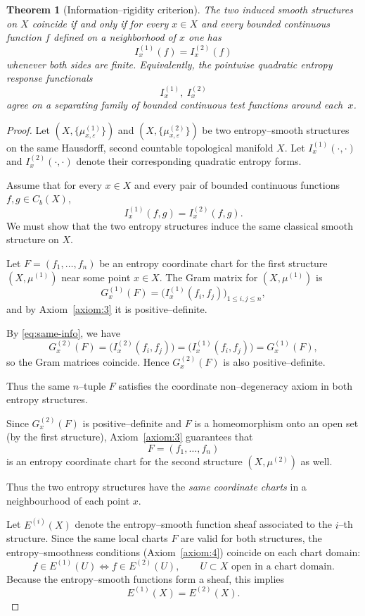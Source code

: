 \documentclass[11pt]{amsart}
\newtheorem{theorem}{Theorem}[section]
\theoremstyle{definition}
\theoremstyle{remark}
\begin{document}
\begin{theorem}[Information--rigidity criterion]\label{thm:info-rigidity}
The two induced smooth structures on $X$ coincide if and only if for
every $x\in X$ and every bounded continuous function $f$ defined on a
neighborhood of $x$ one has
\[
  I^{(1)}_x(f) = I^{(2)}_x(f)
\]
whenever both sides are finite.  Equivalently, the pointwise quadratic
entropy response functionals
\[
  I^{(1)}_x,\ I^{(2)}_x
\]
agree on a separating family of bounded continuous test functions
around each~$x$.
\end{theorem}
\begin{proof}
Let $(X,\{\mu^{(1)}_{x,\varepsilon}\})$ and $(X,\{\mu^{(2)}_{x,\varepsilon}\})$ be two 
entropy--smooth structures on the same Hausdorff, second countable topological manifold $X$.  
Let $I^{(1)}_x(\cdot,\cdot)$ and $I^{(2)}_x(\cdot,\cdot)$ denote their corresponding 
quadratic entropy forms.

Assume that for every $x\in X$ and every pair of bounded continuous functions 
$f,g\in C_b(X)$,
\begin{equation}\label{eq:same-info}
I^{(1)}_x(f,g) = I^{(2)}_x(f,g).
\end{equation}
We must show that the two entropy structures induce the same classical smooth structure 
on $X$.

Let $F=(f_1,\dots,f_n)$ be an entropy coordinate chart for the first structure 
$(X,\mu^{(1)})$ near some point $x\in X$.  
The Gram matrix for $(X,\mu^{(1)})$ is
\[
G^{(1)}_x(F) = \big(I^{(1)}_x(f_i,f_j)\big)_{1\le i,j\le n},
\]
and by Axiom~\ref{axiom:3} it is positive--definite.

By \eqref{eq:same-info}, we have
\[
G^{(2)}_x(F) = \big(I^{(2)}_x(f_i,f_j)\big)
=
\big(I^{(1)}_x(f_i,f_j)\big)
=
G^{(1)}_x(F),
\]
so the Gram matrices coincide.  
Hence $G^{(2)}_x(F)$ is also positive--definite.

Thus the same $n$--tuple $F$ satisfies the coordinate non--degeneracy axiom in both 
entropy structures.

Since $G^{(2)}_x(F)$ is positive--definite and $F$ is a homeomorphism onto an open set 
(by the first structure), Axiom~\ref{axiom:3} guarantees that
\[
F=(f_1,\dots,f_n)
\]
is an entropy coordinate chart for the second structure $(X,\mu^{(2)})$ as well.

Thus the two entropy structures have the \emph{same coordinate charts} in a 
neighbourhood of each point $x$.

Let $E^{(i)}(X)$ denote the entropy--smooth function sheaf associated to the 
$i$--th structure.  
Since the same local charts $F$ are valid for both structures, the entropy--smoothness 
conditions (Axiom~\ref{axiom:4}) coincide on each chart domain:
\[
f\in E^{(1)}(U) \iff f\in E^{(2)}(U),
\qquad U \subset X \text{ open in a chart domain.}
\]
Because the entropy--smooth functions form a sheaf, this implies
\[
E^{(1)}(X) = E^{(2)}(X).
\]


\end{proof}
\end{document}
